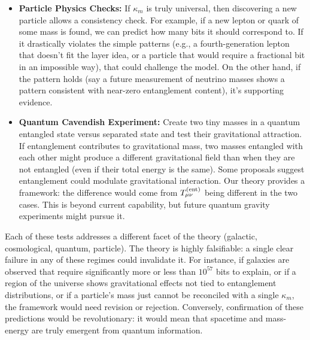 \documentclass[11pt]{article}
\begin{document}
\begin{itemize}
    \item \textbf{Particle Physics Checks:} If $\kappa_m$ is truly universal, then discovering a new particle allows a consistency check. For example, if a new lepton or quark of some mass is found, we can predict how many bits it should correspond to. If it drastically violates the simple patterns (e.g., a fourth-generation lepton that doesn’t fit the layer idea, or a particle that would require a fractional bit in an impossible way), that could challenge the model. On the other hand, if the pattern holds (say a future measurement of neutrino masses shows a pattern consistent with near-zero entanglement content), it’s supporting evidence.

    \item \textbf{Quantum Cavendish Experiment:} Create two tiny masses in a quantum entangled state versus separated state and test their gravitational attraction. If entanglement contributes to gravitational mass, two masses entangled with each other might produce a different gravitational field than when they are not entangled (even if their total energy is the same). Some proposals suggest entanglement could modulate gravitational interaction. Our theory provides a framework: the difference would come from $T_{\mu\nu}^{\rm (ent)}$ being different in the two cases. This is beyond current capability, but future quantum gravity experiments might pursue it.
\end{itemize}

Each of these tests addresses a different facet of the theory (galactic, cosmological, quantum, particle). The theory is highly falsifiable: a single clear failure in any of these regimes could invalidate it. For instance, if galaxies are observed that require significantly more or less than $10^{57}$ bits to explain, or if a region of the universe shows gravitational effects not tied to entanglement distributions, or if a particle’s mass just cannot be reconciled with a single $\kappa_m$, the framework would need revision or rejection. Conversely, confirmation of these predictions would be revolutionary: it would mean that spacetime and mass-energy are truly emergent from quantum information.
\end{document}
